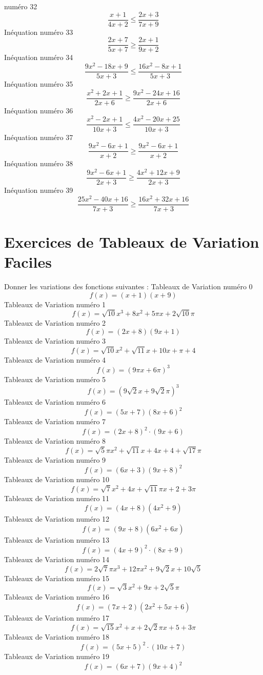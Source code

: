 \documentclass{article}
\begin{document}
num\'ero 32 \[\frac{x + 1}{4 x + 2} \leq \frac{2 x + 3}{7 x + 9}\]In\'equation num\'ero 33 \[\frac{2 x + 7}{5 x + 7} \geq \frac{2 x + 1}{9 x + 2}\]In\'equation num\'ero 34 \[\frac{9 x^{2} - 18 x + 9}{5 x + 3} \leq \frac{16 x^{2} - 8 x + 1}{5 x + 3}\]In\'equation num\'ero 35 \[\frac{x^{2} + 2 x + 1}{2 x + 6} \geq \frac{9 x^{2} - 24 x + 16}{2 x + 6}\]In\'equation num\'ero 36 \[\frac{x^{2} - 2 x + 1}{10 x + 3} \leq \frac{4 x^{2} - 20 x + 25}{10 x + 3}\]In\'equation num\'ero 37 \[\frac{9 x^{2} - 6 x + 1}{x + 2} \geq \frac{9 x^{2} - 6 x + 1}{x + 2}\]In\'equation num\'ero 38 \[\frac{9 x^{2} - 6 x + 1}{2 x + 3} \geq \frac{4 x^{2} + 12 x + 9}{2 x + 3}\]In\'equation num\'ero 39 \[\frac{25 x^{2} - 40 x + 16}{7 x + 3} \geq \frac{16 x^{2} + 32 x + 16}{7 x + 3}\]
 \section{Exercices de Tableaux de Variation Faciles}

 Donner les variations des fonctions suivantes : 
Tableaux de Variation num\'ero 0 \[f(x) = \left(x + 1\right) \left(x + 9\right)\]Tableaux de Variation num\'ero 1 \[f(x) = \sqrt{10} x^{3} + 8 x^{2} + 5 \pi x + 2 \sqrt{10} \pi\]Tableaux de Variation num\'ero 2 \[f(x) = \left(2 x + 8\right) \left(9 x + 1\right)\]Tableaux de Variation num\'ero 3 \[f(x) = \sqrt{10} x^{2} + \sqrt{11} x + 10 x + \pi + 4\]Tableaux de Variation num\'ero 4 \[f(x) = \left(9 \pi x + 6 \pi\right)^{3}\]Tableaux de Variation num\'ero 5 \[f(x) = \left(9 \sqrt{2} x + 9 \sqrt{2} \pi\right)^{3}\]Tableaux de Variation num\'ero 6 \[f(x) = \left(5 x + 7\right) \left(8 x + 6\right)^{2}\]Tableaux de Variation num\'ero 7 \[f(x) = \left(2 x + 8\right)^{2} \cdot \left(9 x + 6\right)\]Tableaux de Variation num\'ero 8 \[f(x) = \sqrt{5} \pi x^{2} + \sqrt{11} x + 4 x + 4 + \sqrt{17} \pi\]Tableaux de Variation num\'ero 9 \[f(x) = \left(6 x + 3\right) \left(9 x + 8\right)^{2}\]Tableaux de Variation num\'ero 10 \[f(x) = \sqrt{7} x^{2} + 4 x + \sqrt{11} \pi x + 2 + 3 \pi\]Tableaux de Variation num\'ero 11 \[f(x) = \left(4 x + 8\right) \left(4 x^{2} + 9\right)\]Tableaux de Variation num\'ero 12 \[f(x) = \left(9 x + 8\right) \left(6 x^{2} + 6 x\right)\]Tableaux de Variation num\'ero 13 \[f(x) = \left(4 x + 9\right)^{2} \cdot \left(8 x + 9\right)\]Tableaux de Variation num\'ero 14 \[f(x) = 2 \sqrt{7} \pi x^{3} + 12 \pi x^{2} + 9 \sqrt{2} x + 10 \sqrt{5}\]Tableaux de Variation num\'ero 15 \[f(x) = \sqrt{3} x^{2} + 9 x + 2 \sqrt{5} \pi\]Tableaux de Variation num\'ero 16 \[f(x) = \left(7 x + 2\right) \left(2 x^{2} + 5 x + 6\right)\]Tableaux de Variation num\'ero 17 \[f(x) = \sqrt{15} x^{2} + x + 2 \sqrt{2} \pi x + 5 + 3 \pi\]Tableaux de Variation num\'ero 18 \[f(x) = \left(5 x + 5\right)^{2} \cdot \left(10 x + 7\right)\]Tableaux de Variation num\'ero 19 \[f(x) = \left(6 x + 7\right) \left(9 x + 4\right)^{2}\]
\end{document}
